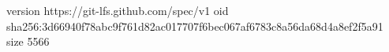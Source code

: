 version https://git-lfs.github.com/spec/v1
oid sha256:3d66940f78abc9f761d82ac017707f6bec067af6783c8a56da68d4a8ef2f5a91
size 5566
